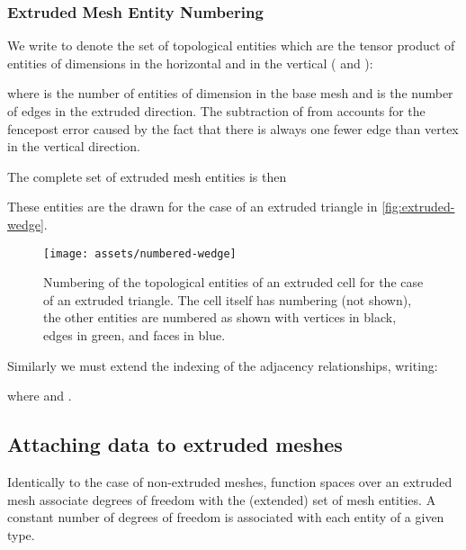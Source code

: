 \documentclass[11pt, a4paper]{scrartcl}
\begin{document}
\subsubsection{Extruded Mesh Entity Numbering}
\label{sssec:entitynumbering}
We write  to denote the set of topological entities
which are the tensor product of entities of dimensions  in the
horizontal and  in the vertical ( and
):

where  is the number of entities of dimension  in
the base mesh and  is the number of edges in the extruded
direction. The subtraction of  from  accounts for the
fencepost error caused by the fact that there is always one fewer edge
than vertex in the vertical direction.

The complete set of extruded mesh entities is then

These entities are the drawn for the case of an extruded triangle in
\autoref{fig:extruded-wedge}.
\begin{figure}[htbp]
  \centering
  \texttt{[image: assets/numbered-wedge]}
  \caption{Numbering of the topological entities of an extruded cell
    for the case of an extruded triangle.  The cell itself has
    numbering  (not shown), the other entities are
    numbered as shown with vertices in black, edges in green, and faces
    in blue.}
  \label{fig:extruded-wedge}
\end{figure}

Similarly we must extend the indexing of the adjacency relationships,
writing:

where  and
.

\subsection{Attaching data to extruded meshes}
\label{ssec:ext-mesh-data}

Identically to the case of non-extruded meshes, function spaces over
an extruded mesh associate degrees of freedom with the (extended) set
of mesh entities. A constant number of degrees of freedom is
associated with each entity of a given type.
\end{document}
